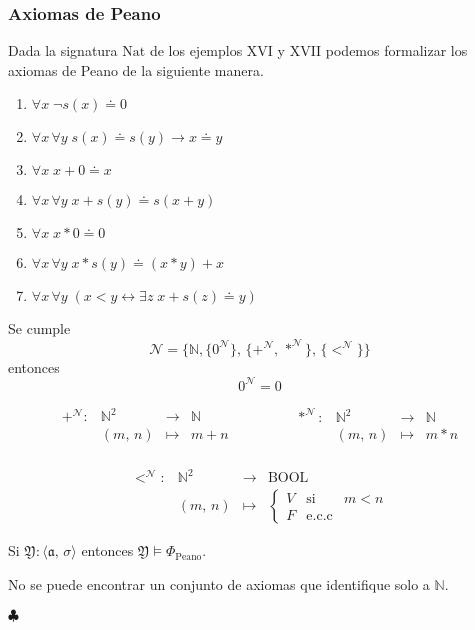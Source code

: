 \subsubsection{Axiomas de Peano}
Dada la signatura $\mbox{Nat}$ de los ejemplos XVI y XVII podemos formalizar los axiomas de Peano de la siguiente manera. 
\begin{enumerate}
    \item $\forall x \; \neg s(x)\doteq 0$
    \item $\forall x \, \forall y \; s(x)\doteq s(y)\to x\doteq y$
    \item $\forall x \; x+0\doteq x$
    \item $\forall x \, \forall y \; x+s(y)\doteq s(x+y)$
    \item $\forall x \; x*0\doteq 0$
    \item $\forall x \, \forall y \; x*s(y)\doteq (x*y)+x$
    \item $\forall x \, \forall y \; (x<y \leftrightarrow \exists z \; x+s(z)\doteq y)$
\end{enumerate}
Se cumple 
\[\mathcal{N}=\{ \mathbb{N}, \{0^{\mathcal{N}}\}, \, \{+^{\mathcal{N}}, \, \ast^{\mathcal{N}}\}, \, \{<^{\mathcal{N}}\} \}\]
entonces
\[ 0^{\mathcal{N}}=0 \]

\[ \begin{matrix}
+^{\mathcal{N}} : &\mathbb{N}^2& \rightarrow & \mathbb{N}\\
&(m, \, n)&\mapsto& m + n
\end{matrix} \qquad \qquad   \begin{matrix}
\ast^{\mathcal{N}} : &\mathbb{N}^2& \rightarrow & \mathbb{N}\\
&(m, \, n)&\mapsto& m * n
\end{matrix}  \]
\paragraph{}
\[  \begin{matrix}
<^{\mathcal{N}} : &\mathbb{N}^2& \rightarrow & \mbox{BOOL}\\
&(m, \, n)&\mapsto& \left\lbrace \begin{matrix}
V & \mbox{si} & m<n\\
F & \mbox{e.c.c} &
\end{matrix}\right.
\end{matrix}  \]

Si $\mathfrak{Y}: \langle \mathfrak{a}, \, \sigma \rangle$ entonces $\mathfrak{Y} \models \Phi_{\mbox{Peano}}$.

\begin{theorem}
No se puede encontrar un conjunto de axiomas que identifique solo a $\mathbb{N}$.
\end{theorem}

$\clubsuit$